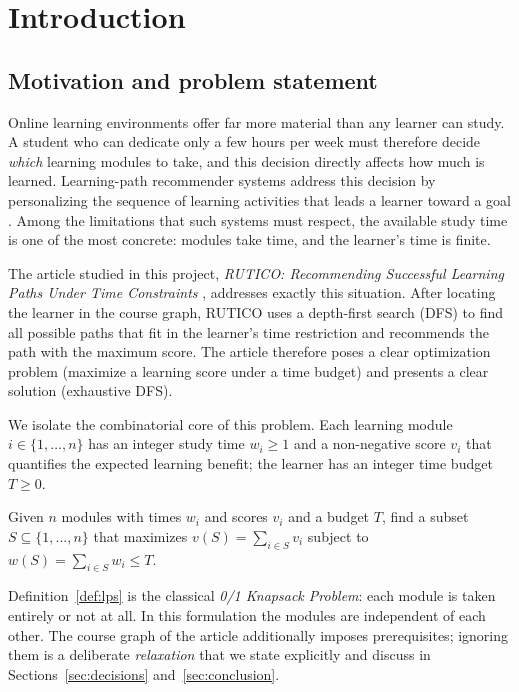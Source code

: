 \section{Introduction}\label{sec:intro}

\subsection{Motivation and problem statement}

Online learning environments offer far more material than any learner can study. A student who can dedicate only a few hours per week must therefore decide \emph{which} learning modules to take, and this decision directly affects how much is learned. Learning-path recommender systems address this decision by personalizing the sequence of learning activities that leads a learner toward a goal \cite{nabizadeh2020survey}. Among the limitations that such systems must respect, the available study time is one of the most concrete: modules take time, and the learner's time is finite.

The article studied in this project, \emph{RUTICO: Recommending Successful Learning Paths Under Time Constraints} \cite{nabizadeh2017rutico}, addresses exactly this situation. After locating the learner in the course graph, RUTICO uses a depth-first search (DFS) to find all possible paths that fit in the learner's time restriction and recommends the path with the maximum score. The article therefore poses a clear optimization problem (maximize a learning score under a time budget) and presents a clear solution (exhaustive DFS).

We isolate the combinatorial core of this problem. Each learning module $i \in \{1,\dots,n\}$ has an integer study time $w_i \ge 1$ and a non-negative score $v_i$ that quantifies the expected learning benefit; the learner has an integer time budget $T \ge 0$.

\begin{definition}\label{def:lps}
Given $n$ modules with times $w_i$ and scores $v_i$ and a budget $T$, find a subset $S \subseteq \{1,\dots,n\}$ that maximizes $v(S)=\sum_{i\in S} v_i$ subject to $w(S)=\sum_{i\in S} w_i \le T$.
\end{definition}

Definition~\ref{def:lps} is the classical \emph{0/1 Knapsack Problem}: each module is taken entirely or not at all. In this formulation the modules are independent of each other. The course graph of the article additionally imposes prerequisites; ignoring them is a deliberate \emph{relaxation} that we state explicitly and discuss in Sections~\ref{sec:decisions} and~\ref{sec:conclusion}.

